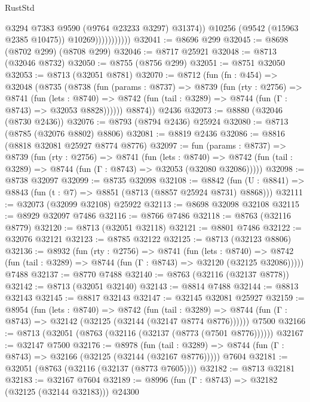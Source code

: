 \begin{lexlean}{RustStd}
\begin{coremodule}
                              @3294
                              @7383
                              @9590
                              (@9764 @23233 @3297)
                              @31374))
                          @10256
                          (@9542 (@15963 @2385 @10475))
                          @10269)))))))))))
@32041 := @8696 @299
@32045 := @8698 (@8702 @299) (@8708 @299)
@32046 := @8717 @25921
@32048 := @8713 (@32046 @8732)
@32050 := @8755 (@8756 @299)
@32051 := @8751 @32050
@32053 := @8713 (@32051 @8781)
@32070 := @8712
    (fun (fn : @454) =>
    @32048
      (@8735
        (@8738
          (fun (params : @8737) =>
          @8739
            (fun (rty : @2756) =>
            @8741
              (fun (lets : @8740) =>
              @8742 (fun (tail : @3289) => @8744 (fun (Γ : @8743) => @32053 @8828))))))
        @8874))
    @2436
@32073 := @8880 (@32046 (@8730 @2436))
@32076 := @8793 (@8794 @2436) @25924
@32080 := @8713 (@8785 (@32076 @8802) @8806)
@32081 := @8819 @2436
@32086 := @8816 (@8818 @32081 @25927 @8774 @8776)
@32097 := fun (params : @8737) =>
  @8739
    (fun (rty : @2756) =>
    @8741
      (fun (lets : @8740) =>
      @8742 (fun (tail : @3289) => @8744 (fun (Γ : @8743) => @32053 (@32080 @32086)))))
@32098 := @8738 @32097
@32099 := @8735 @32098
@32108 := @8842
    (fun (U : @8841) => @8843 (fun (t : @7) => @8851 (@8713 (@8857 @25924 @8731) @8868)))
@32111 := @32073 (@32099 @32108) @25922
@32113 := @8698 @32098 @32108
@32115 := @8929 @32097 @7486
@32116 := @8766 @7486
@32118 := @8763 (@32116 @8779)
@32120 := @8713 (@32051 @32118)
@32121 := @8801 @7486
@32122 := @32076 @32121
@32123 := @8785 @32122
@32125 := @8713 (@32123 @8806)
@32136 := @8932
    (fun (rty : @2756) =>
    @8741
      (fun (lets : @8740) =>
      @8742 (fun (tail : @3289) => @8744 (fun (Γ : @8743) => @32120 (@32125 @32086)))))
    @7488
@32137 := @8770 @7488
@32140 := @8763 (@32116 (@32137 @8778))
@32142 := @8713 (@32051 @32140)
@32143 := @8814 @7488
@32144 := @8813 @32143
@32145 := @8817 @32143
@32147 := @32145 @32081 @25927
@32159 := @8954
    (fun (lets : @8740) =>
    @8742
      (fun (tail : @3289) =>
      @8744 (fun (Γ : @8743) => @32142 (@32125 (@32144 (@32147 @8774 @8776))))))
    @7500
@32166 := @8713 (@32051 (@8763 (@32116 (@32137 (@8773 (@7501 @8776))))))
@32167 := @32147 @7500
@32176 := @8978
    (fun (tail : @3289) => @8744 (fun (Γ : @8743) => @32166 (@32125 (@32144 (@32167 @8776)))))
    @7604
@32181 := @32051 (@8763 (@32116 (@32137 (@8773 @7605))))
@32182 := @8713 @32181
@32183 := @32167 @7604
@32189 := @8996 (fun (Γ : @8743) => @32182 (@32125 (@32144 @32183))) @24300

\end{coremodule}
\end{lexlean}
